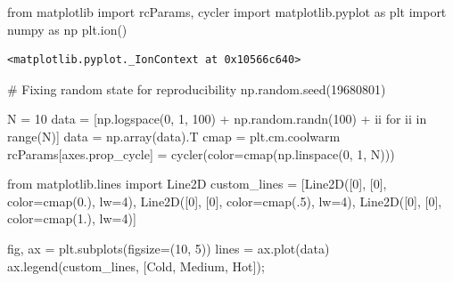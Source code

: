 \documentclass[
  letterpaper,
  DIV=11,
  numbers=noendperiod]{scrreprt}
\newenvironment{Shaded}{\begin{snugshade}}{\end{snugshade}}
\newcommand{\BuiltInTok}[1]{\textcolor[rgb]{0.00,0.23,0.31}{#1}}
\newcommand{\CommentTok}[1]{\textcolor[rgb]{0.37,0.37,0.37}{#1}}
\newcommand{\ControlFlowTok}[1]{\textcolor[rgb]{0.00,0.23,0.31}{#1}}
\newcommand{\DecValTok}[1]{\textcolor[rgb]{0.68,0.00,0.00}{#1}}
\newcommand{\FloatTok}[1]{\textcolor[rgb]{0.68,0.00,0.00}{#1}}
\newcommand{\ImportTok}[1]{\textcolor[rgb]{0.00,0.46,0.62}{#1}}
\newcommand{\KeywordTok}[1]{\textcolor[rgb]{0.00,0.23,0.31}{#1}}
\newcommand{\NormalTok}[1]{\textcolor[rgb]{0.00,0.23,0.31}{#1}}
\newcommand{\OperatorTok}[1]{\textcolor[rgb]{0.37,0.37,0.37}{#1}}
\newcommand{\StringTok}[1]{\textcolor[rgb]{0.13,0.47,0.30}{#1}}
\begin{document}
\begin{Shaded}
\begin{Highlighting}[]
\ImportTok{from}\NormalTok{ matplotlib }\ImportTok{import}\NormalTok{ rcParams, cycler}
\ImportTok{import}\NormalTok{ matplotlib.pyplot }\ImportTok{as}\NormalTok{ plt}
\ImportTok{import}\NormalTok{ numpy }\ImportTok{as}\NormalTok{ np}
\NormalTok{plt.ion()}
\end{Highlighting}
\end{Shaded}

\begin{verbatim}
<matplotlib.pyplot._IonContext at 0x10566c640>
\end{verbatim}

\begin{Shaded}
\begin{Highlighting}[]
\CommentTok{\# Fixing random state for reproducibility}
\NormalTok{np.random.seed(}\DecValTok{19680801}\NormalTok{)}

\NormalTok{N }\OperatorTok{=} \DecValTok{10}
\NormalTok{data }\OperatorTok{=}\NormalTok{ [np.logspace(}\DecValTok{0}\NormalTok{, }\DecValTok{1}\NormalTok{, }\DecValTok{100}\NormalTok{) }\OperatorTok{+}\NormalTok{ np.random.randn(}\DecValTok{100}\NormalTok{) }\OperatorTok{+}\NormalTok{ ii }\ControlFlowTok{for}\NormalTok{ ii }\KeywordTok{in} \BuiltInTok{range}\NormalTok{(N)]}
\NormalTok{data }\OperatorTok{=}\NormalTok{ np.array(data).T}
\NormalTok{cmap }\OperatorTok{=}\NormalTok{ plt.cm.coolwarm}
\NormalTok{rcParams[}\StringTok{\textquotesingle{}axes.prop\_cycle\textquotesingle{}}\NormalTok{] }\OperatorTok{=}\NormalTok{ cycler(color}\OperatorTok{=}\NormalTok{cmap(np.linspace(}\DecValTok{0}\NormalTok{, }\DecValTok{1}\NormalTok{, N)))}


\ImportTok{from}\NormalTok{ matplotlib.lines }\ImportTok{import}\NormalTok{ Line2D}
\NormalTok{custom\_lines }\OperatorTok{=}\NormalTok{ [Line2D([}\DecValTok{0}\NormalTok{], [}\DecValTok{0}\NormalTok{], color}\OperatorTok{=}\NormalTok{cmap(}\FloatTok{0.}\NormalTok{), lw}\OperatorTok{=}\DecValTok{4}\NormalTok{),}
\NormalTok{                Line2D([}\DecValTok{0}\NormalTok{], [}\DecValTok{0}\NormalTok{], color}\OperatorTok{=}\NormalTok{cmap(}\FloatTok{.5}\NormalTok{), lw}\OperatorTok{=}\DecValTok{4}\NormalTok{),}
\NormalTok{                Line2D([}\DecValTok{0}\NormalTok{], [}\DecValTok{0}\NormalTok{], color}\OperatorTok{=}\NormalTok{cmap(}\FloatTok{1.}\NormalTok{), lw}\OperatorTok{=}\DecValTok{4}\NormalTok{)]}

\NormalTok{fig, ax }\OperatorTok{=}\NormalTok{ plt.subplots(figsize}\OperatorTok{=}\NormalTok{(}\DecValTok{10}\NormalTok{, }\DecValTok{5}\NormalTok{))}
\NormalTok{lines }\OperatorTok{=}\NormalTok{ ax.plot(data)}
\NormalTok{ax.legend(custom\_lines, [}\StringTok{\textquotesingle{}Cold\textquotesingle{}}\NormalTok{, }\StringTok{\textquotesingle{}Medium\textquotesingle{}}\NormalTok{, }\StringTok{\textquotesingle{}Hot\textquotesingle{}}\NormalTok{])}\OperatorTok{;}
\end{Highlighting}
\end{Shaded}
\end{document}
